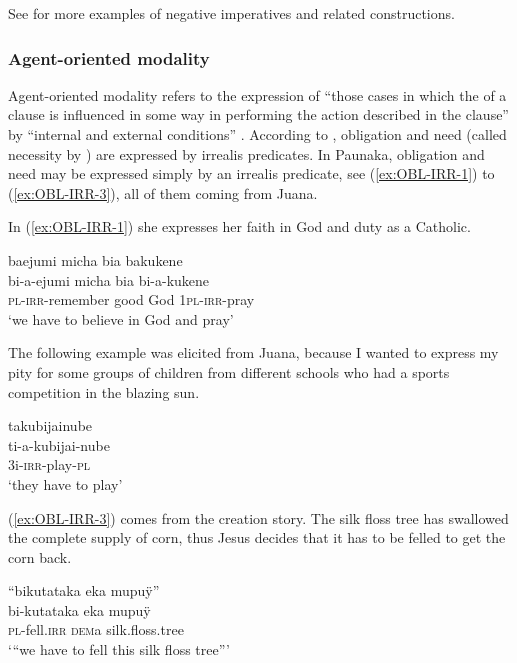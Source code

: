 See  for more examples of negative imperatives and related constructions.

\subsubsection{Agent-oriented modality}\label{sec:Agent-orientedModality}
Agent-oriented modality refers to the expression of “those cases in which the  of a clause is influenced in some way in performing the action described in the clause” \citep[30]{deHaan2005} by “internal and external conditions” \citep[177]{Bybee_et_al1994}. According to \citet[252]{Michael2014}, obligation and need (called necessity by \citealt[177]{Bybee_et_al1994}) are expressed by irrealis predicates. In Paunaka, obligation and need may be expressed simply by an irrealis predicate, see (\ref{ex:OBL-IRR-1}) to (\ref{ex:OBL-IRR-3}), all of them coming from Juana.

In (\ref{ex:OBL-IRR-1}) she expresses her faith in God and duty as a Catholic.

\ea\label{ex:OBL-IRR-1}
\begingl 
\glpreamble baejumi micha bia bakukene\\
\gla bi-a-ejumi micha bia bi-a-kukene\\ 
\textsc{pl}-\textsc{irr}-remember good God 1\textsc{pl}-\textsc{irr}-pray\\ 
\glft ‘we have to believe in God and pray’
\xe


The following example was elicited from Juana, because I wanted to express my pity for some groups of children from different schools who had a sports competition in the blazing sun.

\ea\label{ex:OBL-IRR-4}
\begingl
\glpreamble takubijainube\\
\gla ti-a-kubijai-nube\\
\glb 3i-\textsc{irr}-play-\textsc{pl}\\
\glft ‘they have to play’
\endgl
 \trailingcitation{[jrx-e151019l-2]}
\xe

(\ref{ex:OBL-IRR-3}) comes from the creation story. The silk floss tree has swallowed the complete supply of corn, thus Jesus decides that it has to be felled to get the corn back.

\ea\label{ex:OBL-IRR-3}
\begingl
\glpreamble “bikutataka eka mupuÿ”\\
\gla bi-kutataka eka mupuÿ\\
\textsc{pl}-fell.\textsc{irr} \textsc{dem}a silk.floss.tree\\
\glft ‘“we have to fell this silk floss tree”’
\endgl
 \trailingcitation{[jxx-n101013s-1.793-794]}
\xe

